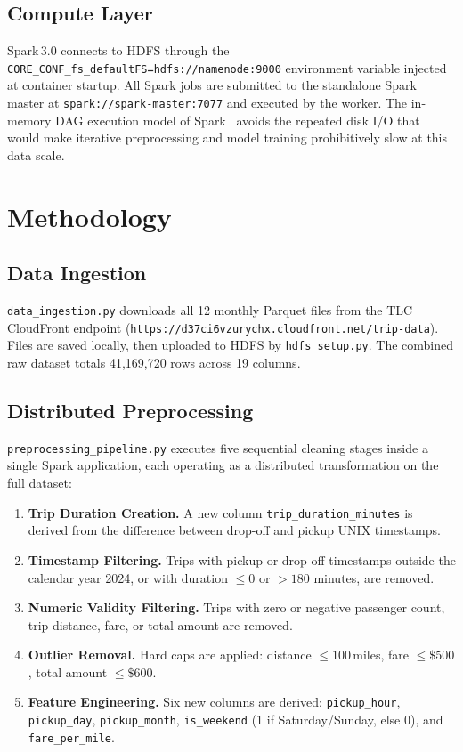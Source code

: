 \documentclass[conference]{IEEEtran}
\begin{document}
\subsection{Compute Layer}

Spark\,3.0 connects to HDFS through the
\texttt{CORE\_CONF\_fs\_defaultFS=hdfs://namenode:9000} environment
variable injected at container startup. All Spark jobs are submitted
to the standalone Spark master at \texttt{spark://spark-master:7077}
and executed by the worker. The in-memory DAG execution model
of Spark~\cite{zaharia2016apache} avoids the repeated disk I/O that
would make iterative preprocessing and model training prohibitively
slow at this data scale.

\section{Methodology}
\label{sec:method}

\subsection{Data Ingestion}

\texttt{data\_ingestion.py} downloads all 12 monthly Parquet files
from the TLC CloudFront endpoint
(\texttt{https://d37ci6vzurychx.cloudfront.net/trip-data}).
Files are saved locally, then uploaded to HDFS by
\texttt{hdfs\_setup.py}. The combined raw dataset totals
41,169,720 rows across 19 columns.

\subsection{Distributed Preprocessing}

\texttt{preprocessing\_pipeline.py} executes five sequential
cleaning stages inside a single Spark application, each operating
as a distributed transformation on the full dataset:

\begin{enumerate}
  \item \textbf{Trip Duration Creation.} A new column
        \texttt{trip\_duration\_minutes} is derived from the
        difference between drop-off and pickup UNIX timestamps.
  \item \textbf{Timestamp Filtering.} Trips with pickup or drop-off
        timestamps outside the calendar year 2024, or with duration
        $\leq 0$ or $> 180$ minutes, are removed.
  \item \textbf{Numeric Validity Filtering.} Trips with zero or
        negative passenger count, trip distance, fare, or total
        amount are removed.
  \item \textbf{Outlier Removal.} Hard caps are applied:
        distance $\leq 100$\,miles, fare $\leq \$500$,
        total amount $\leq \$600$.
  \item \textbf{Feature Engineering.} Six new columns are
        derived: \texttt{pickup\_hour}, \texttt{pickup\_day},
        \texttt{pickup\_month}, \texttt{is\_weekend}
        (1 if Saturday/Sunday, else 0), and
        \texttt{fare\_per\_mile}.
\end{enumerate}
\end{document}
